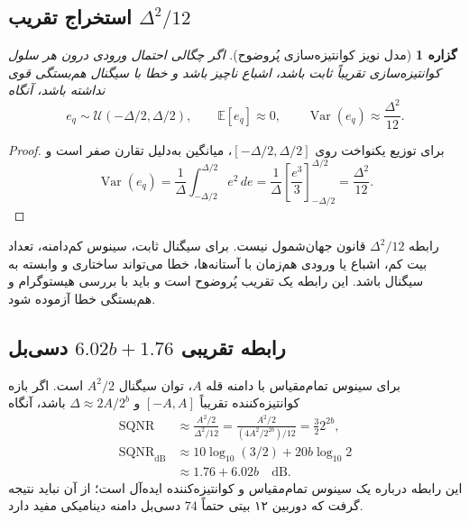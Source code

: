 \documentclass[12pt,openany,oneside]{book}
\newtheorem{proposition}{گزاره}[chapter]
\newcommand{\E}{\mathbb{E}}
\newcommand{\Var}{\operatorname{Var}}
\begin{document}
\subsection{استخراج تقریب \(\Delta^2/12\)}

\begin{proposition}[مدل نویز کوانتیزه‌سازی پُروضوح]
اگر چگالی احتمال ورودی درون هر سلول کوانتیزه‌سازی تقریباً ثابت باشد، اشباع ناچیز باشد و
خطا با سیگنال هم‌بستگی قوی نداشته باشد، آنگاه
\begin{equation}
e_q\sim\mathcal U(-\Delta/2,\Delta/2),
\qquad \E[e_q]\approx0,
\qquad \Var(e_q)\approx\frac{\Delta^2}{12}.
\label{eq:quantization-noise}
\end{equation}
\end{proposition}

\begin{proof}
برای توزیع یکنواخت روی \([-\Delta/2,\Delta/2]\)، میانگین به‌دلیل تقارن صفر است و
\begin{equation}
\Var(e_q)=\frac{1}{\Delta}
\int_{-\Delta/2}^{\Delta/2}e^2\,de
=\frac{1}{\Delta}\left[\frac{e^3}{3}\right]_{-\Delta/2}^{\Delta/2}
=\frac{\Delta^2}{12}.
\end{equation}
\end{proof}

\begin{warningbox}
رابطه \(\Delta^2/12\) قانون جهان‌شمول نیست. برای سیگنال ثابت، سینوس کم‌دامنه، تعداد بیت کم،
اشباع یا ورودی هم‌زمان با آستانه‌ها، خطا می‌تواند ساختاری و وابسته به سیگنال باشد. این رابطه یک
تقریب پُروضوح است و باید با بررسی هیستوگرام و هم‌بستگی خطا آزموده شود.
\end{warningbox}

\subsection{رابطه تقریبی \(6.02b+1.76\) دسی‌بل}

برای سینوس تمام‌مقیاس با دامنه قله \(A\)، توان سیگنال \(A^2/2\) است. اگر بازه کوانتیزه‌کننده
تقریباً \([-A,A]\) و \(\Delta\approx2A/2^b\) باشد، آنگاه
\begin{align}
\operatorname{SQNR}
&\approx\frac{A^2/2}{\Delta^2/12}
=\frac{A^2/2}{(4A^2/2^{2b})/12}
=\frac{3}{2}2^{2b},\\
\operatorname{SQNR}_{\mathrm{dB}}
&\approx10\log_{10}(3/2)+20b\log_{10}2\\
&\approx1.76+6.02b\quad\mathrm{dB}.
\label{eq:sqnr-bits}
\end{align}
این رابطه درباره یک سینوس تمام‌مقیاس و کوانتیزه‌کننده ایده‌آل است؛ از آن نباید نتیجه گرفت که
دوربین ۱۲ بیتی حتماً \(74\) دسی‌بل دامنه دینامیکی مفید دارد.
\end{document}
